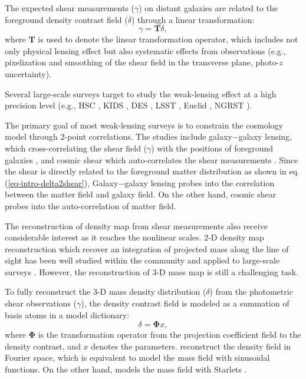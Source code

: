\documentclass[twocolumn]{aastex62}
\begin{document}
The expected shear measurements ($\gamma$) on distant galaxies are related to
the foreground density contrast field ($\delta$) through a linear
transformation: \begin{equation} \label{eq-intro-delta2shear} \gamma=\mathbf{T}
\delta, \end{equation} where $\mathbf{T}$ is used to denote the linear
transformation operator, which includes not only physical lensing effect but
also systematic effects from observations (e.g., pixelization and smoothing of
the shear field in the transverse plane, photo-$z$ uncertainty).

Several large-scale surveys target to study the weak-lensing effect at a high
precision level (e.g., HSC \citep{HSC1-data}, KIDS \citep{KIDS13}, DES
\citep{DES05}, LSST \citep{LSSTScienceBook}, Euclid \citep{Euclid2011}, NGRST
\citep{WFIRST15}).

The primary goal of most weak-lensing surveys is to constrain the cosmology
model through $2$-point correlations. The studies include galaxy$-$galaxy
lensing, which cross-correlating the shear field ($\gamma$) with the positions
of foreground galaxies
\citep{gglens-GAMA-Han2014,gglens-BossCFHTMore2015,gglens-DES1}, and cosmic
shear which auto-correlates the shear measurements
\citep{cosmicShearRealKids450,cosmicShear-DES1,cosmicShear_HSC1_Chiaki2019,cosmicShear_HSC1_Hamana2019}.
Since the shear is directly related to the foreground matter distribution as
shown in eq.  (\ref{eq-intro-delta2shear}), Galaxy$-$galaxy lensing probes into
the correlation between the matter field and galaxy field. On the other hand,
cosmic shear probes into the auto-correlation of matter field.

The reconstruction of density map from shear measurements also receive considerable interest as it reaches the nonlinear scales.
$2$-D density map reconstruction which recover an integration of projected mass along the line of sight has been well studied
within the community \citep{massMap-KS1993,WL-massMap-Glimpse2D-Lanusse2016,sparseBaysianMassMap-Price2020}
and applied to large-scale surveys \citep{HSC1-massMaps,massMapDES-Chang2018,DES-SV-massMap-sparsity}. However, the
reconstruction of $3$-D mass map is still a challenging task.

To fully reconstruct the $3$-D mass density distribution ($\delta$) from the
photometric shear observations ($\gamma$), the density contrast field is
modeled as a summation of basis atoms in a model dictionary:
\begin{equation} \label{eq-intro-dict}
 \delta= \mathbf{\Phi} x,
\end{equation}
where $\mathbf{\Phi}$ is the transformation operator from the projection
coefficient field to the density contrast, and $x$ denotes the parameters.
\citet{LSS-massMap-Wiener-Simon2009} reconstruct the density field in Fourier
space, which is equivalent to model the mass field with sinusoidal functions.
On the other hand, \citet{LSS-massMap-Glimpse3D-Leonard2014} models the mass
field with Starlets \citep{Starlet-Starck2015}.
\end{document}
